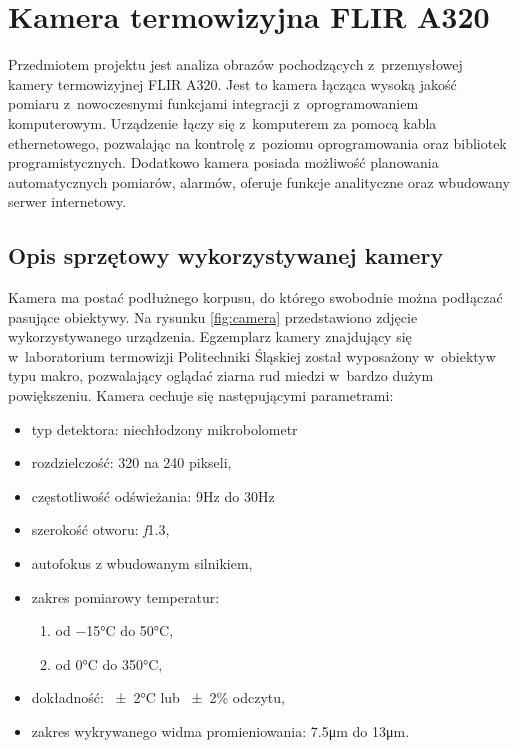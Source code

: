 \section{Kamera termowizyjna FLIR A320}
Przedmiotem projektu jest analiza obrazów pochodzących z~przemysłowej
kamery termowizyjnej FLIR A320.
Jest to kamera łącząca wysoką jakość pomiaru z~nowoczesnymi funkcjami
integracji z~oprogramowaniem komputerowym.
Urządzenie łączy się z~komputerem za pomocą kabla ethernetowego,
pozwalając na kontrolę z~poziomu oprogramowania oraz bibliotek
programistycznych.
Dodatkowo kamera posiada możliwość planowania automatycznych pomiarów,
alarmów, oferuje funkcje analityczne oraz wbudowany serwer internetowy.

\subsection{Opis sprzętowy wykorzystywanej kamery}
Kamera ma postać podłużnego korpusu, do którego swobodnie można podłączać
pasujące obiektywy.
Na rysunku \ref{fig:camera} przedstawiono zdjęcie wykorzystywanego urządzenia.
Egzemplarz kamery znajdujący się w~laboratorium termowizji Politechniki
Śląskiej został wyposażony w~obiektyw typu makro, pozwalający oglądać
ziarna rud miedzi w~bardzo dużym powiększeniu.
Kamera cechuje się następującymi parametrami:
\begin{itemize}
	\item typ detektora: niechłodzony mikrobolometr
	\item rozdzielczość: \num{320} na \num{240} pikseli,
	\item częstotliwość odświeżania: \num{9}\si{\hertz} do \num{30}\si{\hertz}
	\item szerokość otworu: \textit{f}\num{1,3},
	\item autofokus z wbudowanym silnikiem,
	\item zakres pomiarowy temperatur: 
		\begin{enumerate}
			\item od \num{-15}\si{\celsius} do \num{+50}\si{\celsius},
			\item od \num{0}\si{\celsius} do \num{350}\si{\celsius},
		\end{enumerate}
	\item dokładność: \num{\pm2}\si{\celsius} lub \num{\pm2}\% odczytu,
	\item zakres wykrywanego widma promieniowania: \num{7,5}\si{\micro\meter}
          do \num{13}\si{\micro\meter}.
\end{itemize}

